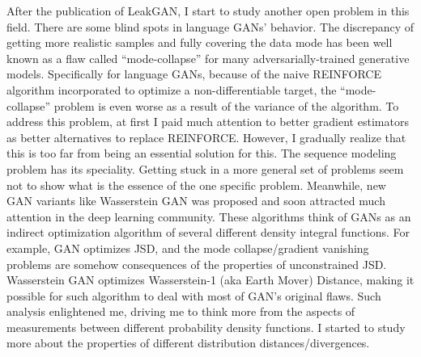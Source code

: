 \documentclass{article}
\begin{document}
      After the publication of LeakGAN, I start to study another open problem in this field. There are some blind spots in language GANs' behavior. The discrepancy of getting more realistic samples and fully covering the data mode has been well known as a flaw called ``mode-collapse'' for many adversarially-trained generative models. Specifically for language GANs, because of the naive REINFORCE algorithm incorporated to optimize a non-differentiable target, the ``mode-collapse'' problem is even worse as a result of the variance of the algorithm. To address this problem, at first I paid much attention to better gradient estimators as better alternatives to replace REINFORCE. However, I gradually realize that this is too far from being an essential solution for this. The sequence modeling problem has its speciality. Getting stuck in a more general set of problems seem not to show what is the essence of the one specific problem. Meanwhile, new GAN variants like Wasserstein GAN was proposed and soon attracted much attention in the deep learning community. These algorithms think of GANs as an indirect optimization algorithm of several different density integral functions. For example, GAN optimizes JSD, and the mode collapse/gradient vanishing problems are somehow consequences of the properties of unconstrained JSD. Wasserstein GAN optimizes Wasserstein-1 (aka Earth Mover) Distance, making it possible for such algorithm to deal with most of GAN's original flaws. Such analysis enlightened me, driving me to think more from the aspects of measurements between different probability density functions. I started to study more about the properties of different distribution distances/divergences.
\end{document}
